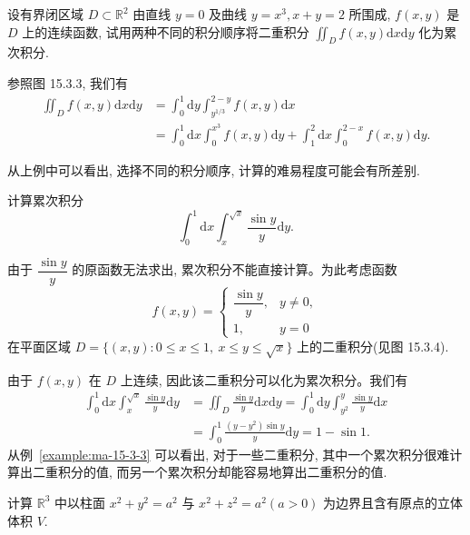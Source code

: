 \begin{example}\label{example:ma-15-3-2}
设有界闭区域 $D\subset\mathbb R^2$ 由直线 $y=0$ 及曲线 $y=x^3,x+y=2$ 所围成, $f(x,y)$ 是 $D$ 上的连续函数, 试用两种不同的积分顺序将二重积分 $\iint_D f(x,y)\mathrm dx\mathrm dy$ 化为累次积分.
\end{example}


\begin{solve}
参照图 15.3.3, 我们有
\[
\begin{aligned}
  \iint_D f(x,y)\mathrm dx\mathrm dy
  &=\int_0^1\mathrm dy\int_{y^{1/3}}^{2-y}f(x,y)\mathrm dx\\
  &=\int_0^1\mathrm dx\int_0^{x^3}f(x,y)\mathrm dy
    +\int_1^2\mathrm dx\int_0^{2-x}f(x,y)\mathrm dy.
\end{aligned}
\]

从上例中可以看出, 选择不同的积分顺序, 计算的难易程度可能会有所差别.
\end{solve}


\begin{example}\label{example:ma-15-3-3}
计算累次积分
\[
  \int_0^1\mathrm dx\int_x^{\sqrt x}\frac{\sin y}{y}\mathrm dy.
\]
\end{example}


\begin{solve}
由于 $\dfrac{\sin y}{y}$ 的原函数无法求出, 累次积分不能直接计算。为此考虑函数
\[
  f(x,y)=
  \begin{cases}
    \dfrac{\sin y}{y}, & y\ne0,\\
    1, & y=0
  \end{cases}
\]
在平面区域 $D=\{(x,y):0\leqslant x\leqslant1,\ x\leqslant y\leqslant\sqrt x\}$ 上的二重积分(见图 15.3.4).

由于 $f(x,y)$ 在 $D$ 上连续, 因此该二重积分可以化为累次积分。我们有
\[
\begin{aligned}
  \int_0^1\mathrm dx\int_x^{\sqrt x}\frac{\sin y}{y}\mathrm dy
  &=\iint_D\frac{\sin y}{y}\mathrm dx\mathrm dy
    =\int_0^1\mathrm dy\int_{y^2}^{y}\frac{\sin y}{y}\mathrm dx\\
  &=\int_0^1\frac{(y-y^2)\sin y}{y}\mathrm dy
    =1-\sin1.
\end{aligned}
\]
从例~\ref{example:ma-15-3-3} 可以看出, 对于一些二重积分, 其中一个累次积分很难计算出二重积分的值, 而另一个累次积分却能容易地算出二重积分的值.
\end{solve}


\begin{example}\label{example:ma-15-3-4}
计算 $\mathbb R^3$ 中以柱面 $x^2+y^2=a^2$ 与 $x^2+z^2=a^2(a>0)$ 为边界且含有原点的立体体积 $V$.
\end{example}


